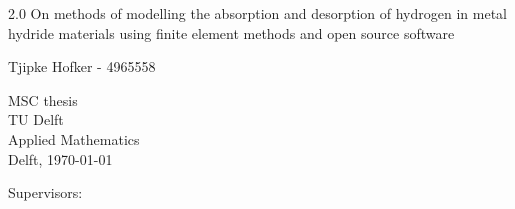 \begin{titlepage} 

	\begin{spacing}{2.0}
        \centering
	{\huge On methods of modelling the absorption and desorption of hydrogen in metal hydride materials using finite element methods and open source software
    }\\[.5cm] %
	\end{spacing}
	
	\centering
	{\LARGE \doublespacing Tjipke Hofker - 4965558}\\
	\vspace{0.5cm}
	

    
        \vfill
\vspace{.5cm}	
 \begin{minipage}{0.49\textwidth}
		\begin{flushleft}
			MSC thesis\\
			TU Delft \\
            Applied Mathematics\\
            Delft, \today
		\end{flushleft}
	\end{minipage}
\hfill
	\begin{minipage}{0.49\textwidth}
		\begin{flushright}
    {Supervisors:}  \par
      \par
    	\end{flushright}
	\end{minipage}
		
\end{titlepage}